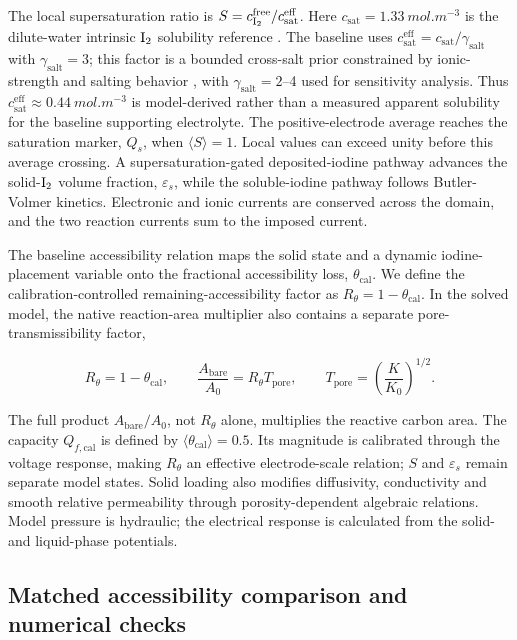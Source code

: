 \documentclass[11pt]{article}
\begin{document}
The local supersaturation ratio is $S=c_{\ce{I2}}^{\mathrm{free}}/c_{\mathrm{sat}}^{\mathrm{eff}}$. Here $c_{\mathrm{sat}}=\SI{1.33}{mol.m^{-3}}$ is the dilute-water intrinsic $\ce{I2}$ solubility reference \citep{Ramette1965}. The baseline uses $c_{\mathrm{sat}}^{\mathrm{eff}}=c_{\mathrm{sat}}/\gamma_{\mathrm{salt}}$ with $\gamma_{\mathrm{salt}}=3$; this factor is a bounded cross-salt prior constrained by ionic-strength and salting behavior \citep{Palmer1984}, with $\gamma_{\mathrm{salt}}=2$--4 used for sensitivity analysis. Thus $c_{\mathrm{sat}}^{\mathrm{eff}}\approx\SI{0.44}{mol.m^{-3}}$ is model-derived rather than a measured apparent solubility for the baseline supporting electrolyte. The positive-electrode average reaches the saturation marker, $Q_s$, when $\langle S\rangle=1$. Local values can exceed unity before this average crossing. A supersaturation-gated deposited-iodine pathway advances the solid-$\ce{I2}$ volume fraction, $\varepsilon_s$, while the soluble-iodine pathway follows Butler-Volmer kinetics. Electronic and ionic currents are conserved across the domain, and the two reaction currents sum to the imposed current.

The baseline accessibility relation maps the solid state and a dynamic iodine-placement variable onto the fractional accessibility loss, $\theta_{\mathrm{cal}}$. We define the calibration-controlled remaining-accessibility factor as $R_\theta=1-\theta_{\mathrm{cal}}$. In the solved model, the native reaction-area multiplier also contains a separate pore-transmissibility factor,

\[
R_\theta=1-\theta_{\mathrm{cal}},\qquad
\frac{A_{\mathrm{bare}}}{A_0}=R_\theta T_{\mathrm{pore}},\qquad
T_{\mathrm{pore}}=\left(\frac{K}{K_0}\right)^{1/2}.
\]

The full product $A_{\mathrm{bare}}/A_0$, not $R_\theta$ alone, multiplies the reactive carbon area. The capacity $Q_{f,\mathrm{cal}}$ is defined by $\langle\theta_{\mathrm{cal}}\rangle=0.5$. Its magnitude is calibrated through the voltage response, making $R_\theta$ an effective electrode-scale relation; $S$ and $\varepsilon_s$ remain separate model states. Solid loading also modifies diffusivity, conductivity and smooth relative permeability through porosity-dependent algebraic relations. Model pressure is hydraulic; the electrical response is calculated from the solid- and liquid-phase potentials.

\subsection{Matched accessibility comparison and numerical checks}
\end{document}
